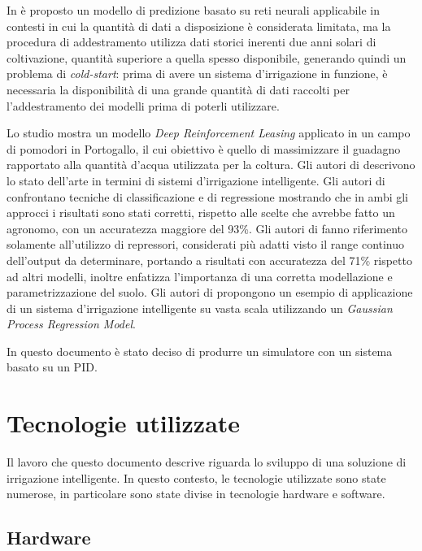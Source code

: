 \documentclass[12pt,a4paper,openright,twoside, openany]{book}
\begin{document}
In \cite{Gonzalez2019} è proposto un modello di predizione basato su reti neurali applicabile in contesti in cui la quantità di dati a disposizione è considerata limitata, ma la procedura di addestramento utilizza dati storici inerenti due anni solari di coltivazione, quantità superiore a quella spesso disponibile, generando quindi un problema di \textit{cold-start}: prima di avere un sistema d'irrigazione in funzione, è necessaria la disponibilità di una grande quantità di dati raccolti per l'addestramento dei modelli prima di poterli utilizzare.

Lo studio \cite{Alibaei2022} mostra un modello \textit{Deep Reinforcement Leasing} applicato in un campo di pomodori in Portogallo, il cui obiettivo è quello di massimizzare il guadagno rapportato alla quantità d'acqua utilizzata per la coltura.  Gli autori di \cite{García2020, Emmanuel2022} descrivono lo stato dell'arte in termini di sistemi d'irrigazione intelligente.
Gli autori di \cite{Goldstein2017} confrontano tecniche di classificazione e di regressione mostrando che in ambi gli approcci i risultati sono stati corretti, rispetto alle scelte che avrebbe fatto un agronomo, con un accuratezza maggiore del 93\%. Gli autori di \cite{Sidhu2020} fanno riferimento solamente all'utilizzo di repressori, considerati più adatti visto il range continuo dell'output da determinare, portando a risultati con accuratezza del 71\% rispetto ad altri modelli, inoltre enfatizza l'importanza di una corretta modellazione e parametrizzazione del suolo. Gli autori di \cite{Emami2022} propongono un esempio di applicazione di un sistema d'irrigazione intelligente su vasta scala utilizzando un \textit{Gaussian Process Regression Model}.

In questo documento è stato deciso di produrre un simulatore con un sistema basato su un \ac{PID}.
\newpage
\chapter{Tecnologie utilizzate}


Il lavoro che questo documento descrive riguarda lo sviluppo di una soluzione di irrigazione intelligente. In questo contesto, le tecnologie utilizzate sono state numerose, in particolare sono state divise in tecnologie hardware e software.

\section{Hardware}
\end{document}
